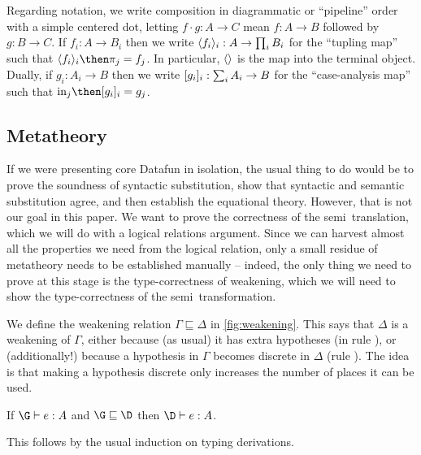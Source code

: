 Regarding notation, we write composition in diagrammatic or ``pipeline'' order with a simple centered dot, letting $f \cdot g : A \to C$ mean $f : A \to B$ followed by $g : B \to C$.
%
If $f_i : A \to B_i$ then we write $\langle{f_i}\rangle_i : A \to \prod_i B_i$ for the
``tupling map'' such that $\fork{f_i}_i \then \pi_j = f_j$.
%
In particular, $\langle{}\rangle$ is the map into the terminal object.
%
Dually, if $g_i : A_i \to B$ then we write $[{g_i}]_i : \sum_i A_i
\to B$ for the ``case-analysis map'' such that $\injc_j \then \krof{g_i}_i =
g_j$.



\subsection{Metatheory}
\label{sec:weakening}

If we were presenting core Datafun in isolation, the usual thing to do would be
to prove the soundness of syntactic substitution, show that syntactic and
semantic substitution agree, and then establish the equational theory. However,
that is not our goal in this paper. We want to prove the correctness of the
semi\naive\ translation, which we will do with a logical relations argument.
Since we can harvest almost all the properties we need from the logical
relation, only a small residue of metatheory needs to be established manually --
indeed, the only thing we need to prove at this stage is the type-correctness of
weakening, which we will need to show the type-correctness of the
semi\naive\ transformation.

We define the weakening relation $\Gamma \sqsubseteq \Delta$ in
\cref{fig:weakening}. This says that $\Delta$ is a weakening of $\Gamma$, either
because (as usual) it has extra hypotheses (in rule ), or
(additionally!) because a hypothesis in $\Gamma$ becomes discrete in $\Delta$
(rule ). The idea is that making a hypothesis discrete only increases
the number of places it can be used.

\begin{lemma}\label{thm:weaken}
  If $\J e \G A$ and $\G \sqsubseteq \D$ then $\J e \D A$.
\end{lemma}

\noindent This follows by the usual induction on typing derivations.


